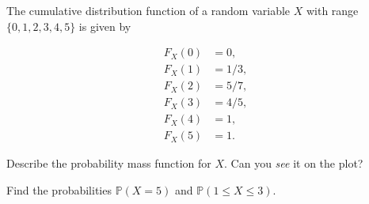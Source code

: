 \documentclass[../main.tex]{subfiles}
\begin{document}
\begin{example} \label{ex:random-varialbe-pmf-to-cdf}
  The cumulative distribution function of a random variable \(X\) with range \(\{0,1,2,3,4,5\}\) is given by 

  \begin{minipage}{0.4\textwidth}
    \begin{align*}
      F_{X}(0) &= 0,  \\ 
      F_{X}(1) &= 1/3, \\
      F_{X}(2) &= 5/7, \\ 
      F_{X}(3) &= 4/5, \\ 
      F_{X}(4) &= 1,   \\
      F_{X}(5) &= 1.
    \end{align*}
  \end{minipage}
  \begin{minipage}{0.4\textwidth}
  \end{minipage}


  Describe the probability mass function for \(X\). Can you \emph{see} it on the plot?

  Find the probabilities \(\mathbb{P}(X = 5)\) and \(\mathbb{P}(1 \le X \le 3)\).
\end{example}

\end{document}
